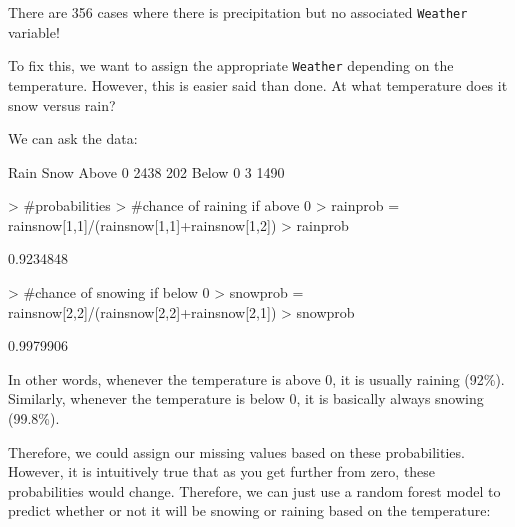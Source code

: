 \documentclass[11pt, a4paper]{article}
\begin{document}
There are 356 cases where there is precipitation but no associated \texttt{Weather} variable!
\par
To fix this, we want to assign the appropriate \texttt{Weather} depending on the temperature. However, this is easier said than done. At what temperature does it snow versus rain?
\par
We can ask the data:

\begin{Schunk}
\begin{Soutput}
          Rain Snow
  Above 0 2438  202
  Below 0    3 1490
\end{Soutput}
\begin{Sinput}
> #probabilities
> #chance of raining if above 0
> rainprob = rainsnow[1,1]/(rainsnow[1,1]+rainsnow[1,2])
> rainprob
\end{Sinput}
\begin{Soutput}
[1] 0.9234848
\end{Soutput}
\begin{Sinput}
> #chance of snowing if below 0
> snowprob = rainsnow[2,2]/(rainsnow[2,2]+rainsnow[2,1])
> snowprob
\end{Sinput}
\begin{Soutput}
[1] 0.9979906
\end{Soutput}
\end{Schunk}

In other words, whenever the temperature is above 0, it is usually raining (92\%). Similarly, whenever the temperature is below 0, it is basically always snowing (99.8\%).
\par
Therefore, we could assign our missing values based on these probabilities. However, it is intuitively true that as you get further from zero, these probabilities would change. Therefore, we can just use a random forest model to predict whether or not it will be snowing or raining based on the temperature:
\end{document}
